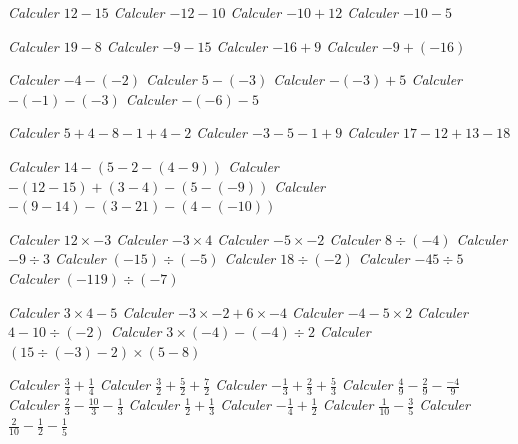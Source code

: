 \if {}  \it
  Calculer  $12 -15$ 
\fi   
\if {} \it
  Calculer  $-12 - 10$ 
\fi   \if{}  \it
  Calculer  $-10+ 12$ 
\fi   \if{}  \it
  Calculer  $-10-5$ 

\fi   \if{}  \it
  Calculer  $19-8$
\fi   \if{}  \it
  Calculer  $-9 - 15$
\fi   \if{}  \it
  Calculer  $-16 + 9$
\fi   \if{} \it
  Calculer  $-9 + (-16)$

\fi   \if{}  \it
  Calculer  $-4 - (-2)$
\fi   \if{}  \it
  Calculer  $5 - (-3)$
\fi   \if{}  \it
  Calculer  $-(-3) + 5$
\fi   \if{}  \it
  Calculer  $-(-1) - (-3)$
\fi   \if{}  \it
  Calculer  $-(-6) - 5$

\fi   \if{}  \it
  Calculer  $5 + 4 - 8 - 1 + 4 -2 $
\fi   \if{}  \it
  Calculer  $-3 - 5 - 1 + 9$
\fi   \if{}  \it
  Calculer  $17 - 12 + 13 - 18$

\fi   \if{}  \it
  Calculer  $14- (5-2 - (4-9))$
\fi   \if{}  \it
  Calculer  $-(12-15) + (3-4) - (5-(-9))$ 
\fi   \if{}  \it
  Calculer  $-(9-14) - (3-21) - (4-(-10))$ 

\fi   \if{}  \it
  Calculer  $12 \times -3$
\fi   \if{}  \it
  Calculer  $-3 \times 4 $
\fi   \if{}  \it
  Calculer  $-5 \times -2$ 
\fi   \if{}  \it
  Calculer  $8\div(-4)$
\fi   \if{}  \it
  Calculer  $-9\div3$
\fi   \if{}  \it
  Calculer  $(-15)\div(-5)$
\fi   \if{}  \it
  Calculer  $18\div(-2)$
\fi   \if{} \it
  Calculer  $-45\div5$
\fi   \if{}  \it
  Calculer  $(-119)\div(-7)$

\fi   \if{}  \it
  Calculer  $3\times 4 - 5$
\fi   \if{}  \it
  Calculer  $-3 \times -2 + 6 \times -4$
\fi   \if{}  \it
  Calculer  $-4 - 5 \times 2$
\fi   \if{}  \it
  Calculer  $4 - 10 \div (-2)$
\fi   \if{}  \it
  Calculer  $3\times (-4) - (-4) \div 2$
\fi   \if{}  \it
  Calculer  $(15 \div (-3) - 2)\times (5- 8)$

\fi   \if{}  \it
  Calculer  $\displaystyle\frac34 + \frac14$
\fi   \if{}  \it
  Calculer  $\displaystyle\frac32 + \frac52 + \frac72$
\fi   \if{}  \it
  Calculer  $\displaystyle-\frac13 + \frac23 + \frac53$
\fi   \if{}  \it
  Calculer  $\displaystyle\frac49 - \frac29 - \frac{-4}9$
\fi   \if{}  \it
  Calculer  $\displaystyle\frac23 - \frac{10}3 - \frac{1}3$
\fi   \if{}  \it
  Calculer  $\displaystyle\frac12 + \frac13$
\fi   \if{}  \it
  Calculer  $\displaystyle-\frac14 + \frac12$
\fi   \if{}  \it
  Calculer  $\displaystyle\frac1{10} - \frac35$
\fi   \if{}  \it
  Calculer  $\displaystyle\frac2{10} - \frac12 - \frac15$ 

